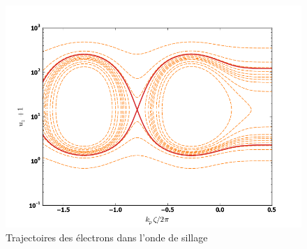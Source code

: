 \documentclass[a4paper]{book}
\begin{document}
\begin{figure}[!htbp]
\begin{center}
\includegraphics[width=12cm]{trajectories.png}
\end{center}
\caption{Trajectoires des électrons dans l'onde de sillage}
\label{fig:1D_pot_field}
\end{figure}

\printbibliography[title={Bibliographie}]



%
%
\end{document}
